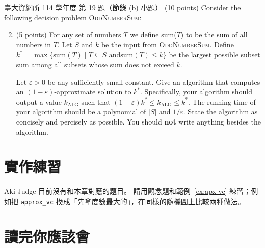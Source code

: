 \begin{pastexam}[label={px:apx-4}]{臺大資網所 114 學年度 第 19 題（節錄 (b) 小題）}
(10 points) Consider the following decision problem \textsc{OddNumberSum}:
\begin{center}
\end{center}
\begin{enumerate}[label=(\alph*)]
\setcounter{enumi}{1}
\item (5 points) For any set of numbers $T$ we define sum($T$) to be the sum of all numbers in $T$. Let $S$
and $k$ be the input from \textsc{OddNumberSum}. Define $k^*=\max\{\mathrm{sum}(T)\mid T\subseteq S\text{ and
}\mathrm{sum}(T)\le k\}$ be the largest possible subset sum among all subsets whose sum does not exceed $k$.

Let $\varepsilon>0$ be any sufficiently small constant. Give an algorithm that computes an
$(1-\varepsilon)$-approximate solution to $k^*$. Specifically, your algorithm should output a value
$k_{\mathrm{ALG}}$ such that $(1-\varepsilon)k^*\le k_{\mathrm{ALG}}\le k^*$. The running time of your
algorithm should be a polynomial of $|S|$ and $1/\varepsilon$. State the algorithm as concisely and
percisely as possible. You should \textbf{not} write anything besides the algorithm.
\end{enumerate}
\end{pastexam}

\section{實作練習}
\label{sec:apx-practice}

Aki-Judge 目前沒有和本章對應的題目。 請用觀念題和範例~\ref{ex:apx-vc} 練習；例如把
\texttt{approx\_vc} 換成「先拿度數最大的」，在同樣的隨機圖上比較兩種做法。

\section{讀完你應該會}
\label{sec:apx-checklist}

